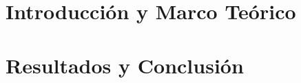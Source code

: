 \documentclass[11pt,oneside,final]{huthesis}
\begin{document}
\dsp



\part{Introducción y Marco Teórico}
%




\part{Resultados y Conclusión}



\appendix

{
\nocite{*}
\ssp
\def\newblock{}



}
\end{document}
